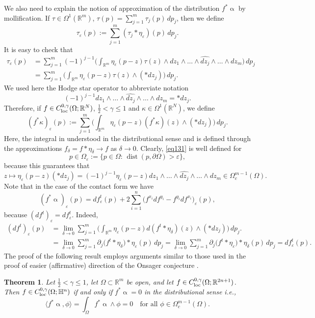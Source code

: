 \documentclass[intlimits,12pt,reqno]{amsart}
\newcommand{\bbbh}{\mathbb H}
\newcommand{\R}{\mathbb R}
\newcommand{\eps}{\varepsilon}
\numberwithin{equation}{section}
\def\dist{\operatorname{dist}}
\newtheorem{theorem}{Theorem}[section]
\theoremstyle{definition}
\begin{document}
We also need to explain the notion of approximation of the distribution $f^*\upalpha$ by mollification.
If $\tau\in\Omega^1(\R^m)$, $\tau(p)=\sum_{j=1}^m\tau_j(p)\, dp_j$, then we define
$$
\tau_\eps(p):=\sum_{j=1}^m(\tau_j*\eta_\eps)(p)\, dp_j.
$$
It is easy to check that 
\[
\begin{split}
\tau_\eps(p)
&=
\sum_{j=1}^m (-1)^{j-1}\bigg(\int_{\R^m}
\eta_{\eps}(p-z)\tau(z)\wedge dz_1\wedge\ldots\wedge\widehat{dz_j}\wedge\ldots\wedge dz_m\bigg)\, dp_j\\
&=
\sum_{j=1}^m \bigg(\int_{\R^m}
\eta_{\eps}(p-z)\tau(z)\wedge (*dz_j)\bigg)\, dp_j.
\end{split} 
\]
We used here the Hodge star operator to abbreviate notation
$$
(-1)^{j-1}dz_1\wedge\ldots\wedge\widehat{dz_j}\wedge\ldots\wedge dz_m=*dz_j.
$$
Therefore, if $f\in C^{0,\gamma}_{\rm loc}(\Omega;\R^N)$, $\frac{1}{2}<\gamma\leq 1$ and $\kappa\in \Omega^1(\R^N)$, we define
\begin{equation}
\label{eq131}
(f^*\kappa)_\eps(p):=\sum_{j=1}^m \bigg(\int_{\R^m}
\eta_{\eps}(p-z)(f^*\kappa)(z)\wedge (*dz_j)\bigg)\, dp_j.
\end{equation}
Here, the integral in understood in the distributional sense and is defined through the approximations $f_\delta=f*\eta_\delta\to f$ as $\delta\to 0$.
Clearly, \eqref{eq131} is well defined for
$$
p\in \Omega_\eps:=\{p\in\Omega:\, \dist(p,\partial\Omega)>\eps\},
$$
because this guarantees that
$$
z\mapsto\eta_\eps(p-z)(*dz_j)=
(-1)^{j-1}\eta_\eps(p-z)dz_1\wedge\ldots\wedge\widehat{dz_j}\wedge\ldots\wedge dz_m\in \Omega_c^{m-1}(\Omega).
$$
Note that in the case of the contact form we have
$$
(f^*\upalpha)_\eps(p)=
df^t_\eps(p)+2\sum_{i=1}^n \big(f^{x_i}df^{y_i}-f^{y_i}df^{x_i}\big)_\eps(p),
$$
because $(df^t)_\eps=df^t_\eps$. Indeed, 
\[
\begin{split}
(df^t)_\eps(p)
&=
\lim_{\delta\to 0} \sum_{j=1}^m \bigg(\int_{\R^m}
\eta_{\eps}(p-z)d(f^t*\eta_\delta)(z)\wedge (*dz_j)\bigg)\, dp_j.\\
&=
\lim_{\delta\to 0} \sum_{j=1}^m \partial_j \big(f^t*\eta_\delta\big)*\eta_\eps(p)\, dp_j=
\lim_{\delta\to 0} \sum_{j=1}^m \partial_j \big(f^t*\eta_\eps\big)*\eta_\delta(p)\, dp_j=
df_\eps^t(p).
\end{split}
\]
The proof of the following result employs arguments similar to those used in the proof of easier (affirmative) direction of the Onsager conjecture \cite{CET94}.
\begin{theorem}
\label{T99}
Let $\frac{1}{2}<\gamma\leq 1$, let $\Omega\subset\R^m$ be open, and let $f\in C^{0,\gamma}_{\rm loc}(\Omega;\R^{2n+1})$. Then $f\in C^{0,\gamma}_{\rm loc}(\Omega;\bbbh^n)$ if and only if $f^*\upalpha=0$ in the distributional sense i.e., 
$$
\langle f^*\upalpha,\phi\rangle = \int_\Omega f^*\upalpha\wedge\phi=0
\quad
\text{for all } \phi\in\Omega_c^{m-1}(\Omega).
$$
\end{theorem}
\end{document}
